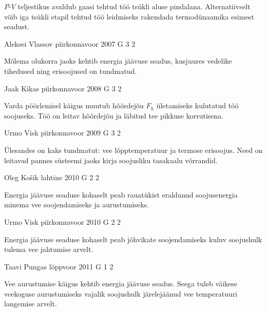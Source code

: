 \documentclass[11pt]{article}
\begin{document}
{{\ifHint
$P$-$V$ teljestikus avaldub gaasi tehtud töö tsükli aluse pindalana. Alternatiivselt võib iga tsükli etapil tehtud töö leidmiseks rakendada termodünaamika esimest seadust.
\fi
}

{Aleksei Vlassov} %
{piirkonnavoor} %
{2007} %
{G 3} %
{2} %
{

\ifHint
Mõlema olukorra jaoks kehtib energia jäävuse seadus, kusjuures vedelike tihedused ning erisoojused on tundmatud.
\fi
}

{Jaak Kikas} %
{piirkonnavoor} %
{2008} %
{G 3} %
{2} %
{

\ifHint
Varda pöörlemisel käigus muutub hõõrdejõu $F_h$ ületamiseks kulutatud töö soojuseks. Töö on leitav hõõrdejõu ja läbitud tee pikkuse korrutisena.
\fi
}

{Urmo Visk} %
{piirkonnavoor} %
{2009} %
{G 3} %
{2} %
{

\ifHint
Ülesandes on kaks tundmatut: vee lõpptemperatuur ja termose erisoojus. Need on leitavad pannes süsteemi jaoks kirja soojusliku tasakaalu võrrandid.
\fi
}

{Oleg Košik} %
{lahtine} %
{2010} %
{G 2} %
{2} %
{

\ifHint
Energia jäävuse seaduse kohaselt peab rauatükist eraldunud soojusenergia minema vee soojendamiseks ja aurustumiseks.
\fi
}

{Urmo Visk} %
{piirkonnavoor} %
{2010} %
{G 2} %
{2} %
{

\ifHint
Energia jäävuse seaduse kohaselt peab jõhvikate soojendamiseks kuluv soojushulk tulema vee jahtumise arvelt.
\fi
}

{Taavi Pungas} %
{lõppvoor} %
{2011} %
{G 1} %
{2} %
{

\ifHint
Vee aurustumise käigus kehtib energia jäävuse seadus. Seega tuleb väikese veekoguse aurustumiseks vajalik soojushulk järelejäänud vee temperatuuri langemise arvelt.
\fi
}

}
\end{document}
